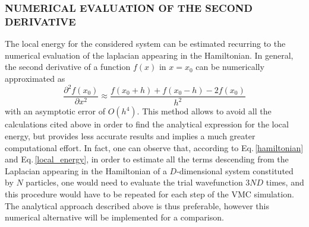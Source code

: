 \subsubsection{NUMERICAL EVALUATION OF THE SECOND DERIVATIVE}
The local energy for the considered system can be estimated recurring to the numerical evaluation of the laplacian appearing in the Hamiltonian. In general, the second derivative of a function $f(x)$ in $x=x_0$ can be numerically approximated as
\begin{equation*}
    \frac{\partial^2 f (x_0)}{\partial x^2} \approx \frac{f(x_0 + h) + f(x_0-h) - 2 f(x_0)}{h^2}
\end{equation*}
with an asymptotic error of $O(h^4)$. This method allows to avoid all the calculations cited above in order to find the analytical expression for the local energy, but provides less accurate results and implies a much greater computational effort. In fact, one can observe that, according to Eq.\,\ref{hamiltonian} and Eq.\,\ref{local_energy}, in order to estimate all the terms descending from the Laplacian appearing in the Hamiltonian of a $D$-dimensional system constituted by $N$ particles, one would need to evaluate the trial wavefunction $3ND$ times, and this procedure would have to be repeated for each step of the VMC simulation. The analytical approach described above is thus preferable, however this numerical alternative will be implemented for a comparison.




